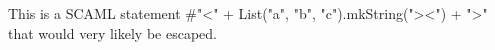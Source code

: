 This is a SCAML statement #{"<" + List("a", "b", "c").mkString("><") + ">"} that
would very likely be escaped.


